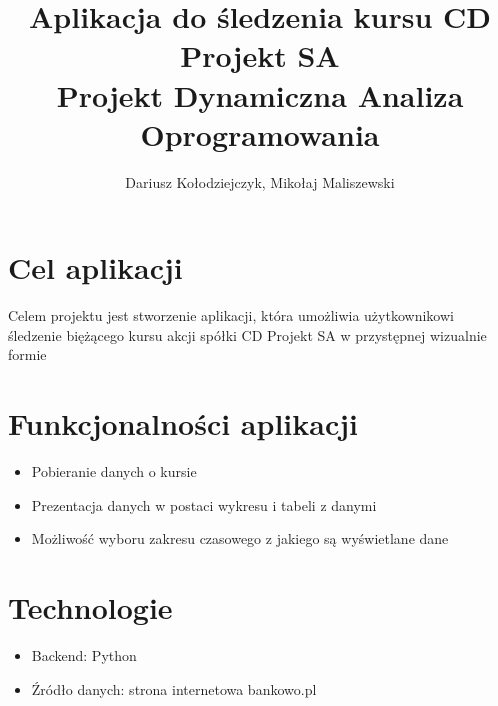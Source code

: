 \documentclass{article}
\begin{document}
		\title{Aplikacja do śledzenia kursu CD Projekt SA \\ Projekt Dynamiczna Analiza Oprogramowania}
	\author{Dariusz Kołodziejczyk, Mikołaj Maliszewski}
	\maketitle
	\section{Cel aplikacji}
	\noindent Celem projektu jest stworzenie aplikacji, która umożliwia użytkownikowi śledzenie biężącego kursu akcji spółki CD Projekt SA w przystępnej wizualnie formie
	\section{Funkcjonalności aplikacji}
	\begin{itemize}
		\item Pobieranie danych o kursie 
		\item Prezentacja danych w postaci wykresu i tabeli z danymi
		\item Możliwość wyboru zakresu czasowego z jakiego są wyświetlane dane
	\end{itemize}
	\section{Technologie}
	\begin{itemize}
		\item 	Backend: Python
		\item Źródło danych: strona internetowa bankowo.pl 
	\end{itemize}
	
\end{document}
